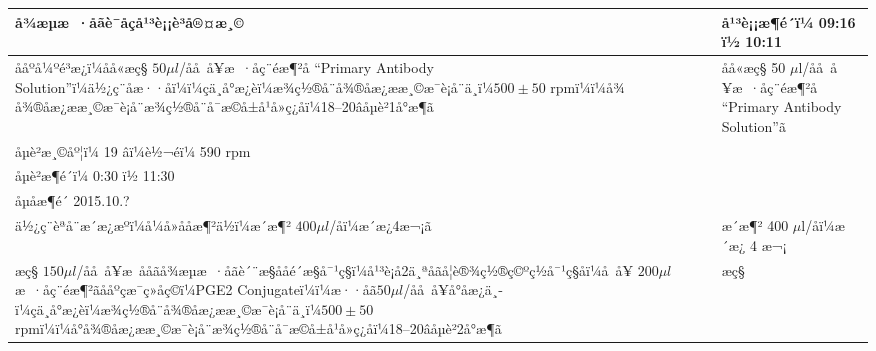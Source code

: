 \documentclass[UTF8,10pt,a4paper,fontset=fandol]{ctexart}
\newcommand{\fieldvalue}[1]{#1}
\newcommand{\handwritten}[1]{#1}
\begin{document}
\begin{tabularx}{\textwidth}{|p{}|X|}
\hline
å¾æµæ ·åãè¯åçå¹³è¡¡è³å®¤æ¸© &
å¹³è¡¡æ¶é´ï¼
\fieldvalue{\handwritten{09:16 ï½ 10:11}}\\
\hline
ååºå¼ºé³æ¿ï¼åå«æç§ $50\mu l$/å­å å¥æ ·åç¨éæ¶²å ``Primary Antibody Solution''ï¼ä½¿ç¨åæ··åï¼ï¼çä¸å°æ¿èï¼æ¾ç½®å¨å¾®å­æ¿ææ¸©æ¯è¡å¨ä¸ï¼$500\pm50$ rpmï¼ï¼å¾å¾®å­æ¿ææ¸©æ¯è¡å¨æ¾ç½®å¨å¯æ©å±å¹å»ç¿åï¼18--20âå­µè²1å°æ¶ã &
åå«æç§
\fieldvalue{\handwritten{50}} $\mu$l/å­å å¥æ ·åç¨éæ¶²å ``Primary Antibody Solution''ã\\
å­µè²æ¸©åº¦ï¼
\fieldvalue{\handwritten{19}} âï¼è½¬éï¼
\fieldvalue{\handwritten{590}} rpm\\
å­µè²æ¶é´ï¼
\fieldvalue{\handwritten{0:30}} ï½ 
\fieldvalue{\handwritten{11:30}}\\
\handwritten{å­µåæ¶é´ 2015.10.?}\\
\hline
ä½¿ç¨èªå¨æ´æ¿æºï¼å¼å»å­åæ¶²ä½ï¼æ´æ¶² $400\mu l$/å­ï¼æ´æ¿4æ¬¡ã &
æ´æ¶²
\fieldvalue{\handwritten{400}} $\mu$l/å­ï¼æ´æ¿
\fieldvalue{\handwritten{4}} æ¬¡\\
\hline
æç§ $150\mu l$/å­å å¥æ ååãå¾æµæ ·åãè´¨æ§ååé´æ§å¯¹ç§ï¼å¹³è¡å2ä¸ªå­ãå¦è®¾ç½®ç©ºç½å¯¹ç§å­ï¼å å¥ $200\mu l$ æ ·åç¨éæ¶²ãååºçæ¯ç»åç©ï¼PGE2 Conjugateï¼ï¼æ··åã$50\mu l$/å­å å¥å°å­æ¿ä¸­ï¼çä¸å°æ¿èï¼æ¾ç½®å¨å¾®å­æ¿ææ¸©æ¯è¡å¨ä¸ï¼$500\pm50$ rpmï¼ï¼å°å¾®å­æ¿ææ¸©æ¯è¡å¨æ¾ç½®å¨å¯æ©å±å¹å»ç¿åï¼18--20âå­µè²2å°æ¶ã &
æç§

\end{tabularx}
\end{document}
